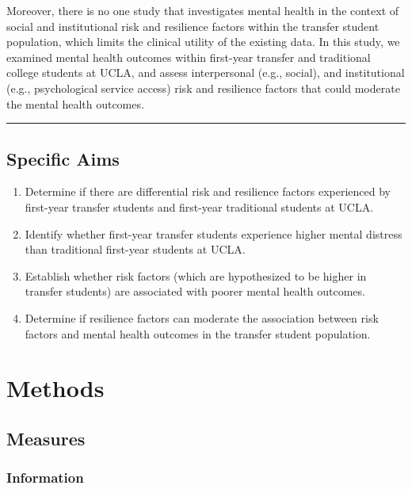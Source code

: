 \documentclass[]{book}
\providecommand{\tightlist}{%
  \setlength{\itemsep}{0pt}\setlength{\parskip}{0pt}}
\begin{document}
Moreover, there is no one study that investigates mental health in the context of social and institutional risk and resilience factors within the transfer student population, which limits the clinical utility of the existing data. In this study, we examined mental health outcomes within first-year transfer and traditional college students at UCLA, and assess interpersonal (e.g., social), and institutional (e.g., psychological service access) risk and resilience factors that could moderate the mental health outcomes.

\begin{center}\rule{0.5\linewidth}{0.5pt}\end{center}

\hypertarget{specific-aims}{%
\section{Specific Aims}\label{specific-aims}}

\begin{enumerate}
\def\labelenumi{\arabic{enumi}.}
\tightlist
\item
  Determine if there are differential risk and resilience factors experienced by first-year transfer students and first-year traditional students at UCLA.
\item
  Identify whether first-year transfer students experience higher mental distress than traditional first-year students at UCLA.
\item
  Establish whether risk factors (which are hypothesized to be higher in transfer students) are associated with poorer mental health outcomes.
\item
  Determine if resilience factors can moderate the association between risk factors and mental health outcomes in the transfer student population.
\end{enumerate}

\hypertarget{methods}{%
\chapter{Methods}\label{methods}}

\hypertarget{measures}{%
\section{Measures}\label{measures}}

\hypertarget{information}{%
\subsection{Information}\label{information}}
\end{document}
